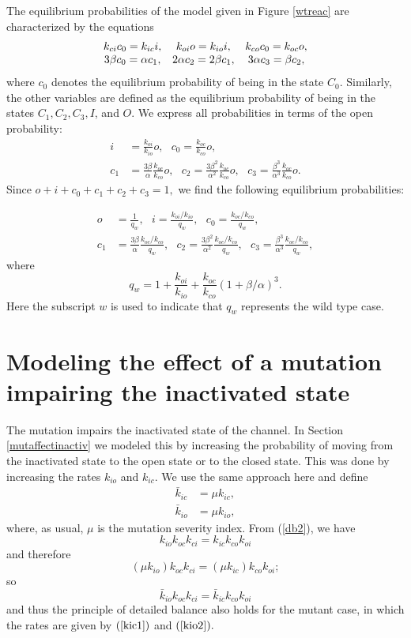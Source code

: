 The equilibrium probabilities of the model given in Figure \ref{wtreac} are
characterized by the equations%
\[%
\begin{array}
[c]{ccc}%
k_{ci}c_{0}=k_{ic}i, & k_{oi}o=k_{io}i, & k_{co}c_{0}=k_{oc}o,\\
3\beta c_{0}=\alpha c_{1}, & 2\alpha c_{2}=2\beta c_{1}, & 3\alpha c_{3}=\beta
c_{2},
\end{array}
\]
where $c_{0}$ denotes the equilibrium probability of being in the state
$C_{0}$. Similarly, the other variables are defined as the equilibrium
probability of being in the states $C_{1},C_{2},C_{3},I$, and $O$. We express all
probabilities in terms of the open probability:%
\begin{align*}
i  &  =\frac{k_{oi}}{k_{io}}o,\text{ }c_{0}=\frac{k_{oc}}{k_{co}}o,\text{ }\\
c_{1}  &  =\frac{3\beta}{\alpha}\frac{k_{oc}}{k_{co}}o,\text{ }c_{2}%
=\frac{3\beta^{2}}{\alpha^{2}}\frac{k_{oc}}{k_{co}}o,\text{ }c_{3}=\frac
{\beta^{3}}{\alpha^{3}}\frac{k_{oc}}{k_{co}}o.
\end{align*}
Since $o+i+c_{0}+c_{1}+c_{2}+c_{3}=1,$ we find the following equilibrium probabilities:%

\begin{align}
o  &  =\frac{1}{q_{w}},\text{ }i=\frac{k_{oi}/k_{io}}{q_{w}},\text{ }%
c_{0}=\frac{k_{oc}/k_{co}}{q_{w}}, \label{prob_wt}\\
c_{1}  &  =\frac{3\beta}{\alpha}\frac{k_{oc}/k_{co}}{q_{w}},\text{ }%
c_{2}=\frac{3\beta^{2}}{\alpha^{2}}\frac{k_{oc}/k_{co}}{q_{w}},\text{ }%
c_{3}=\frac{\beta^{3}}{\alpha^{3}}\frac{k_{oc}/k_{co}}{q_{w}},\nonumber
\end{align}
where%
\[
q_{w}=1+\frac{k_{oi}}{k_{io}}+\frac{k_{oc}}{k_{co}}\left(  1+\beta
/\alpha\right)  ^{3}.
\]
Here the subscript $w$ is used to indicate that $q_{w}$ represents the 
wild type case.

\section{Modeling the effect of a mutation impairing the inactivated state}

The mutation impairs the inactivated state of the channel. In Section
\ref{mutaffectinactiv} we modeled this by increasing the probability of moving
from the inactivated state to the open state or to the closed state. This was
done by increasing the rates $k_{io}$ and $k_{ic}.$ We use the same approach
here and define%
\begin{align}
\bar{k}_{ic}  &  =\mu k_{ic},\label{kic1}\\
\bar{k}_{io}  &  =\mu k_{io}, \label{kio2}%
\end{align}
where, as usual, $\mu$ is the mutation severity index. From (\ref{db2}), we
have
\[
k_{io}k_{oc}k_{ci}=k_{ic}k_{co}k_{oi}%
\]
and therefore%
\[
\left(  \mu k_{io}\right)  k_{oc}k_{ci}=\left(  \mu k_{ic}\right)
k_{co}k_{oi};%
\]
so%
\[
\bar{k}_{io}k_{oc}k_{ci}=\bar{k}_{ic}k_{co}k_{oi}%
\]
and thus the principle of detailed balance also holds for the mutant case,
in which the rates are given by $(\ref{kic1})$ and $(\ref{kio2}).$

